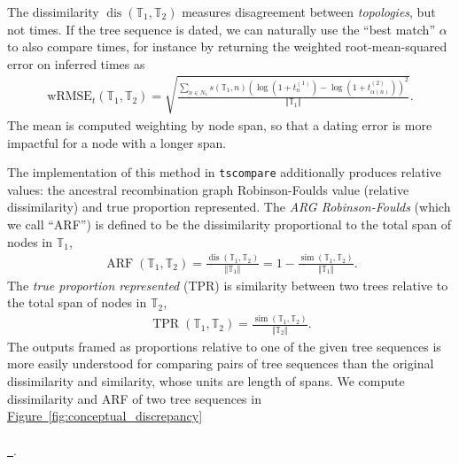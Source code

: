 \documentclass[10pt,twoside,lineno]{gsajnl}
\newcommand{\T}{\mathbb{T}}
\newcommand{\dis}{\operatorname{dis}}
\newcommand{\similarity}{\operatorname{sim}}
\newcommand*{\figref}[2][]{%
	\hyperref[{#2}]{%
		Figure~\ref*{#2}%
		\ifx\\#1\\%
		\else
		\,#1%
		\fi
	}%
}
\begin{document}
The dissimilarity $\dis(\T_1, \T_2)$ measures disagreement between \emph{topologies},
but not times.
If the tree sequence is dated, we can naturally use the ``best match'' $\alpha$
to also compare times,
for instance by returning the weighted root-mean-squared error on inferred times as
\begin{align}\label{eqn:wrmse}
    \text{wRMSE}_t(\T_1, \T_2)
    = \sqrt{\frac{
        \sum_{n \in N_1} s(\T_1,n) \left(\log\left(1+ t^{(1)}_n\right) - \log\left(1+ t^{(2)}_{\alpha(n)}\right) \right)^2 
    }{
        \Vert{\T_1}\Vert
    } } .
\end{align}
The mean is computed weighting by node span, so that a dating error
is more impactful for a node with a longer span. 

The implementation of this method in \texttt{tscompare}
additionally produces relative values:
the ancestral recombination graph Robinson-Foulds value (relative dissimilarity) and true proportion represented. 
The \emph{ARG Robinson-Foulds} (which we call ``ARF'') is defined to be the dissimilarity proportional
 to the total span of nodes in $\T_1$,
 \begin{align}\label{eqn:dissimilarity}
 	\operatorname{ARF}(\T_1,\T_2)=\frac{\dis(\T_1,\T_2)}{\Vert \T_1 \Vert}
 	=1-\frac{\similarity(\T_1,\T_2)}{\Vert \T_1\Vert}.
\end{align}
The \emph{true proportion represented} (TPR) is similarity between two trees relative 
to the total span of nodes in $\T_2$,
\begin{align}\label{eqn:true-proportion}
	\operatorname{TPR}(\T_1,\T_2) = \frac{\similarity(\T_1,\T_2)}
	{\Vert \T_2\Vert}.
\end{align}
The outputs framed as proportions relative to one of the given tree sequences is more easily understood
for comparing pairs of tree sequences than the original dissimilarity and similarity, whose units are length of spans.
We compute dissimilarity and ARF of two tree sequences in \figref{fig:conceptual_discrepancy}.
\end{document}
